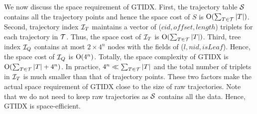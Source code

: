 \documentclass[10pt,conference,letterpaper]{IEEEtran}
\newcommand{\idxname}{GTIDX\xspace }
\newcommand{\alltraj}{{{\cal T}}\xspace}
\newcommand{\trajtable}{{\cal S}\xspace}
\newcommand{\trajindex}{{{\cal I}_T}\xspace}
\newcommand{\treeindex}{{{\cal I}_Q}\xspace}
\newcommand{\bigoh}{{\rm O}\xspace}
\newcommand{\eat}[1]{}
\begin{document}
\vspace{0.1cm}{\bf Space complexity.}
We now discuss the space requirement of \idxname.
First, the trajectory table $\trajtable$ contains all the trajectory points and hence the space cost of $S$ is $\bigoh(\sum_{T\in\alltraj}{|T|})$.
Second, trajectory index $\trajindex$ maintains a vector of ($cid, offset, length$) triplets for each trajectory in $\alltraj$. Thus, the space cost of $\trajindex$ is $\bigoh(\sum_{T\in\alltraj}{|T|})$.
Third, tree index $\treeindex$ contains at most $2\times 4^n$ nodes with the fields of ($l, nid, isLeaf$). Hence, the space cost of $\treeindex$ is $\bigoh(4^n)$.
Totally, the space complexity of \idxname is $\bigoh(\sum_{T\in\alltraj}{|T|} + 4^n)$.
In practice, $4^n\ll\sum_{T\in\alltraj}{|T|}$ and the total number of triplets in $\trajindex$ is much smaller than that of trajectory points. These two factors make the actual space requirement of \idxname close to the size of raw trajectories.
Note that we do not need to keep raw trajectories as $\trajtable$ contains all the data. Hence, \idxname is space-efficient.

\eat{
	Let $N_t$ and $L_t$ represent the number and the average length of trajectories in $\mathbb{D}$. Given the parameter $\lambda$ and the average number of points within in a cell for one trajectory $M_{cell}$, assuming in the worst situation that PR-quadtree is a complete quadtree, the memory cost of \idxname can be calculated as equation (4).
	
	\begin{equation}
	\begin{split}
	Cost(\idxname )=&4\times N_t\times L_t + 3\times \frac{L_t\times N_t}{M_{cell}}\\&+ 4^\lambda + 3\times \frac{4^\lambda -1}{3}
	\end{split}
	\end{equation}
	
	The first fraction is the cost of all data blocks, and four elements (longitude, latitude, timestamp and trajectory ID) need to be stored for a point. And it is also the cost of the raw trajectories. The second fraction represents the cost of cell-based trajectory table, because each node in it has three elements ($cid$, $number$, $offset$) and there are $\frac{L_t\times N_t}{M_{node}}$ nodes. In Global Grid, only an pointer of data block need to be stored, so the cost is $4^\lambda$. At last, there are $\frac{4^\lambda -1}{3}$ nodes in complete PR-quadtree, and in each node $level$, $id$ and $isLeaf$ are neccessary to be retained, so the last fraction represents the cost of PR-quadtree.
	
	From above analysis, we can see space requirements are much smaller than trajectory dataset itself at a proper configuration. For example, in a dataset containing 100,000 trajectories with average length of 800 in a range of $51.2km\times 51.2km$, $\lambda = 9$ (the length of cell side is 100m), and $M_{cell}=10$, we can find raw trajectories need 1280MB to be stored, while in our framework the total memory consumption is 99+1280MB.
}
\end{document}
